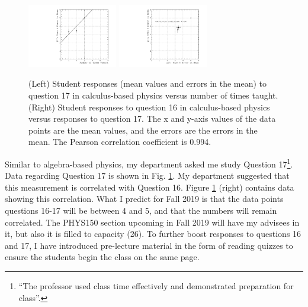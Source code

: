 \documentclass[../../main.tex]{subfiles}
\begin{document}
\begin{figure}
\centering
\includegraphics[width=0.35\textwidth]{Q17_calculus_based.pdf}
\includegraphics[width=0.35\textwidth]{Q16_Q17_calculus_based.pdf}
\caption{\label{fig:courses:intro_q17_2}  (Left) Student responses (mean values and errors in the mean) to question 17 in calculus-based physics versus number of times taught. (Right) Student responses to question 16 in calculus-based physics versus responses to question 17.  The x and y-axis values of the data points are the mean values, and the errors are the errors in the mean.  The Pearson correlation coefficient is 0.994.}
\end{figure}

Similar to algebra-based physics, my department asked me study Question 17\footnote{``The professor used class time effectively and demonstrated preparation for class''.}.  Data regarding Question 17 is shown in Fig. \ref{fig:courses:intro_q17_2}.  My department suggested that this measurement is correlated with Question 16.  Figure \ref{fig:courses:intro_q17_2} (right) contains data showing this correlation.  What I predict for Fall 2019 is that the data points questions 16-17 will be between 4 and 5, and that the numbers will remain correlated.  The PHYS150 section upcoming in Fall 2019 will have my advisees in it, but also it is filled to capacity (26).  To further boost responses to questions 16 and 17, I have introduced pre-lecture material in the form of reading quizzes to ensure the students begin the class on the same page.  \\ \hspace{0.1cm}
\end{document}
